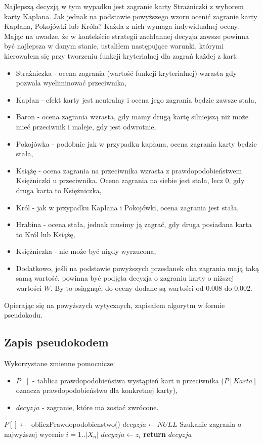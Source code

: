 Najlepszą decyzją w tym wypadku jest zagranie karty Strażniczki z wyborem karty Kapłana. Jak jednak na podstawie powyższego wzoru ocenić zagranie karty Kapłana, Pokojówki lub Króla? Każda z nich wymaga indywidualnej oceny. Mając na uwadze, że w kontekście strategii zachłannej decyzja zawsze powinna być najlepsza w danym stanie, ustaliłem następujące warunki, którymi kierowałem się przy tworzeniu funkcji kryterialnej dla zagrań każdej z kart:
\begin{itemize}
	\item Strażniczka - ocena zagrania (wartość funkcji kryterialnej) wzrasta gdy pozwala wyeliminować przeciwnika,
	\item Kapłan - efekt karty jest neutralny i ocena jego zagrania będzie zawsze stała,
	\item Baron - ocena zagrania wzrasta, gdy mamy drugą kartę silniejszą niż może mieć przeciwnik i maleje, gdy jest odwrotnie,
	\item Pokojówka - podobnie jak w przypadku kapłana, ocena zagrania karty będzie stała,
	\item Książę - ocena zagrania na przeciwnika wzrasta z prawdopodobieństwem Księżniczki u przeciwnika. Ocena zagrania na siebie jest stała, lecz 0, gdy druga karta to Księżniczka,
	\item Król - jak w przypadku Kapłana i Pokojówki, ocena zagrania jest stała,
	\item Hrabina - ocena stała, jednak musimy ją zagrać, gdy druga posiadana karta to Król lub Książę,
	\item Księżniczka - nie może być nigdy wyrzucona,
	\item Dodatkowo, jeśli na podstawie powyższych przesłanek oba zagrania mają taką samą wartość, powinna być podjęta decyzja o zagraniu karty o niższej wartości $W$. By to osiągnąć, do oceny dodane są wartości od 0.008 do 0.002.
\end{itemize}
Opierając się na powyższych wytycznych, zapisałem algorytm w formie pseudokodu.
\subsection{Zapis pseudokodem}
Wykorzystane zmienne pomocnicze:
\begin{itemize}
	\item $P[]$ - tablica prawdopodobieństwa wystąpień kart u przeciwnika ($P[Karta]$ oznacza prawdopodobieństwo dla konkretnej karty),
	\item $decyzja$ - zagranie, które ma zostać zwrócone.
\end{itemize}
\begin{algorithmic}[1]
		\State $P[] \gets$ obliczPrawdopodobienstwo()
		\State $ decyzja \gets NULL$ \Comment Szukanie zagrania o najwyższej wycenie
		 \Comment $i=1..|X_n|$
					\State $decyzja \gets z_i$
				\EndIf
		\EndFor		
		\State \textbf{return} $decyzja$
	\EndFunction
\end{algorithmic}

